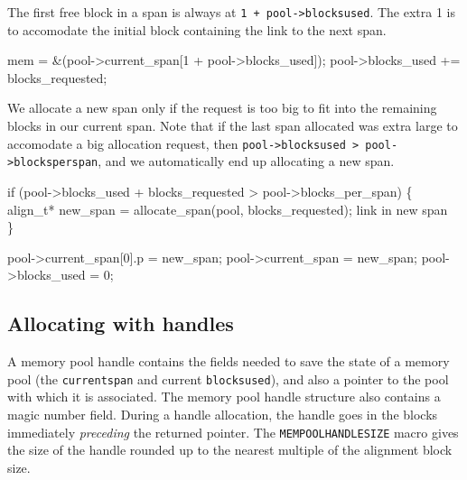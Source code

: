 The first free block in a span is always at {\tt{}1\ +\ pool->blocks{}used}.
The extra 1 is to accomodate the initial block containing the link
to the next span.

\nwenddocs{}\endmoddef
mem = &(pool->current_span[1 + pool->blocks_used]);
pool->blocks_used += blocks_requested;
\nwendcode{}\nwdocspar

We allocate a new span only if the request is too big
to fit into the remaining blocks in our current span.
Note that if the last span allocated was extra large to accomodate
a big allocation request, then {\tt{}pool->blocks{}used\ >\ pool->blocks{}per{}span},
and we automatically end up allocating a new span.

\nwenddocs{}\endmoddef
if (pool->blocks_used + blocks_requested > pool->blocks_per_span) \{
    align_t* new_span = allocate_span(pool, blocks_requested);
    \LA{}link in new span~{\nwtagstyle{}}\RA{}
\}
\nwendcode{}\nwdocspar

\nwenddocs{}\endmoddef
pool->current_span[0].p = new_span;
pool->current_span = new_span;
pool->blocks_used = 0;
\nwendcode{}\nwdocspar


\subsection{Allocating with handles}

A memory pool handle contains the fields needed to save the state
of a memory pool (the {\tt{}current{}span} and current {\tt{}blocks{}used}),
and also a pointer to the pool with which it is associated.
The memory pool handle structure also contains a magic number field.
During a handle allocation, the handle goes in the blocks
immediately \emph{preceding} the returned pointer.
The {\tt{}MEMPOOL{}HANDLE{}SIZE} macro gives the size of the handle
rounded up to the nearest multiple of the alignment block size.

